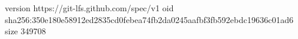 version https://git-lfs.github.com/spec/v1
oid sha256:350e180e58912ed2835cd0febea74fb2da0245aafbf3fb592ebdc19636c01ad6
size 349708
